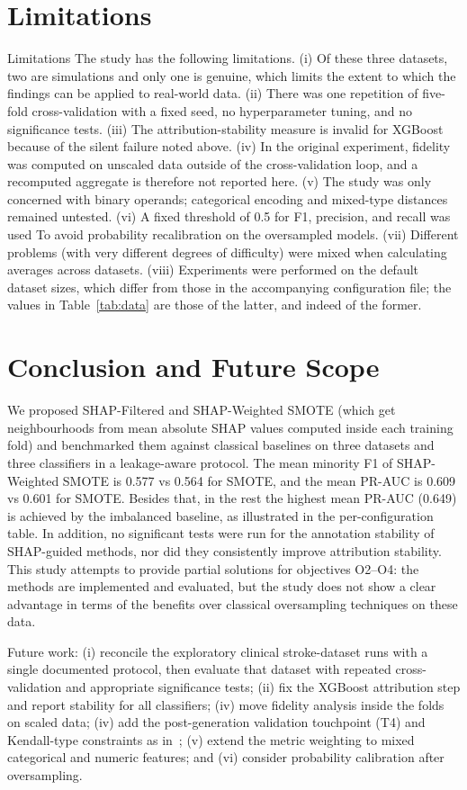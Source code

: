 \documentclass[conference]{IEEEtran}
\begin{document}
\section{Limitations}
Limitations The study has the following limitations. (i) Of these three datasets, two are simulations and only one is genuine, which limits the extent to which the findings can be applied to real-world data. (ii) There was one repetition of five-fold cross-validation with a fixed seed, no hyperparameter tuning, and no significance tests. (iii) The attribution-stability measure is invalid for XGBoost because of the silent failure noted above. (iv) In the original experiment, fidelity was computed on unscaled data outside of the cross-validation loop, and a recomputed aggregate is therefore not reported here. (v) The study was only concerned with binary operands; categorical encoding and mixed-type distances remained untested. (vi) A fixed threshold of 0.5 for F1, precision, and recall was used To avoid probability recalibration on the oversampled models. (vii) Different problems (with very different degrees of difficulty) were mixed when calculating averages across datasets. (viii) Experiments were performed on the default dataset sizes, which differ from those in the accompanying configuration file; the values in Table~\ref{tab:data} are those of the latter, and indeed of the former. 

\section{Conclusion and Future Scope}
We proposed SHAP-Filtered and SHAP-Weighted SMOTE (which get neighbourhoods from mean absolute SHAP values computed inside each training fold) and benchmarked them against classical baselines on three datasets and three classifiers in a leakage-aware protocol. The mean minority F1 of SHAP-Weighted SMOTE is 0.577 vs 0.564 for SMOTE, and the mean PR-AUC is 0.609 vs 0.601 for SMOTE. Besides that, in the rest the highest mean PR-AUC (0.649) is achieved by the imbalanced baseline, as illustrated in the per-configuration table. In addition, no significant tests were run for the annotation stability of SHAP-guided methods, nor did they consistently improve attribution stability. This study attempts to provide partial solutions for objectives O2--O4: the methods are implemented and evaluated, but the study does not show a clear advantage in terms of the benefits over classical oversampling techniques on these data.

Future work: (i) reconcile the exploratory clinical stroke-dataset runs with a single documented protocol, then evaluate that dataset with repeated cross-validation and appropriate significance tests; (ii) fix the XGBoost attribution step and report stability for all classifiers; (iv) move fidelity analysis inside the folds on scaled data; (iv) add the post-generation validation touchpoint (T4) and Kendall-type constraints as in~\cite{b8}; (v) extend the metric weighting to mixed categorical and numeric features; and (vi) consider probability calibration after oversampling.
\end{document}
